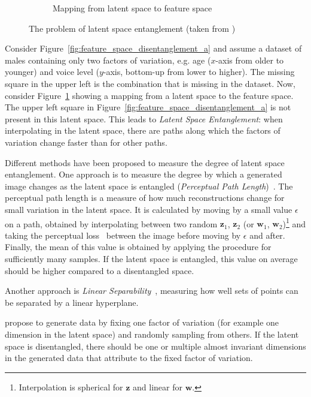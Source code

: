 \begin{figure}
\begin{subfigure}{.3\textwidth}
        \caption{Mapping from latent space to feature space}
        \label{fig:feature_space_disentanglement_b}
    \end{subfigure}
    \caption[Latent Space Entanglement]{The problem of latent space entanglement (taken from \citet{karras2019style})}
    \label{fig:feature_space_disentanglement}
\end{figure}

Consider Figure~\ref{fig:feature_space_disentanglement_a} and assume a dataset of males containing only two factors of variation, e.g. age ($x$-axis from older to younger) and voice level ($y$-axis, bottom-up from lower to higher).
The missing square in the upper left is the combination  that is missing in the dataset.
Now, consider Figure~\ref{fig:feature_space_disentanglement_b} showing a mapping from a latent space to the feature space.
The upper left square in Figure~\ref{fig:feature_space_disentanglement_a} is not present in this latent space.
This leads to \textit{Latent Space Entanglement}: when interpolating in the latent space, there are paths along which the factors of variation change faster than for other paths.

Different methods have been proposed to measure the degree of latent space entanglement.
One approach is to measure the degree by which a generated image changes as the latent space is entangled (\textit{Perceptual Path Length})~\citep{karras2019style}.
The perceptual path length is a measure of how much reconstructions change for small variation in the latent space.
It is calculated by moving by a small value $\epsilon$ on a path, obtained by interpolating between two random $\bm{z}_1$, $\bm{z}_2$ (or $\bm{w}_1$, $\bm{w}_2$)\footnote{Interpolation is spherical for $\bm{z}$ and linear for $\bm{w}$.} and taking the perceptual loss~\citep{johnson2016perceptual} between the image before moving by $\epsilon$ and after.
Finally, the mean of this value is obtained by applying the procedure for sufficiently many samples.
If the latent space is entangled, this value on average should be higher compared to a disentangled space.

Another approach is \textit{Linear Separability}~\citep{karras2019style}, measuring how well sets of points can be separated by a linear hyperplane.

\citet{kim2018disentangling} propose to generate data by fixing one factor of variation (for example one dimension in the latent space) and randomly sampling from others.
If the latent space is disentangled, there should be one or multiple almost invariant dimensions in the generated data that attribute to the fixed factor of variation.

